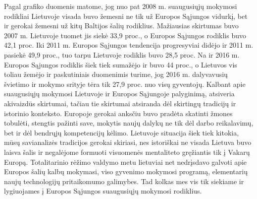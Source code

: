\documentclass[12pt,a4paper, titlepage]{article}
\begin{document}
Pagal grafiko duomenis matome, jog nuo pat 2008 m. suaugusiųjų mokymosi rodikliai Lietuvoje visada buvo žemesni ne tik už Europos Sąjungos vidurkį, bet ir gerokai žemesni už kitų Baltijos šalių rodiklius. Mažiausias skirtumas buvo 2007 m. Lietuvoje tuomet jis siekė 33,9 proc., o Europos Sąjungos rodiklis buvo 42,1 proc. Iki 2011 m. Europos Sąjungos tendencija progresyviai didėjo ir 2011 m. pasiekė 49,9 proc., tuo tarpu Lietuvoje rodiklis buvo 28,5 proc. Na ir 2016 m. Europos Sąjungos rodiklis šiek tiek sumažėjo ir buvo 44 proc., o Lietuvos vis toliau žemėjo ir paskutiniais duomenimis turime, jog 2016 m. dalyvavusių švietimo ir mokymo srityje tėra tik 27,9 proc. nuo visų gyventojų. Kalbant apie suaugusiųjų mokymosi Lietuvoje ir Europos Sąjungoje palyginimą, atsiveria akivaizdūs skirtumai, tačiau tie skirtumai atsiranda dėl skirtingų tradicijų ir istorinio konteksto. Europoje gerokai anksčiu buvo pradėta skatinti žmones tobulėti, stengtis pažinti save, mokytis naujų dalykų ne tik dėl darbo reikalavimų, bet ir dėl bendrųjų kompetencijų kėlimo. Lietuvoje situacija šiek tiek kitokia, mūsų savianalizės tradicijos gerokai skiriasi, nes istoriškai ne visada Lietuva buvo laisva šalis ir negalėjome formuoti visuomenės mentaliteto gręžiantis tik į Vakarų Europą. Totalitarinio rėžimo valdymo metu lietuviai net nedrįsdavo galvoti apie Europos šalių kalbų mokymasi, viso gyvenimo mokymosi programą, elementarių naujų technologijų pritaikomumo galimybes. Tad kolkas mes vis tik siekiame ir lygiuojames į Europos Sąjungos suaugusiųjų mokymosi rodiklius.
\end{document}
